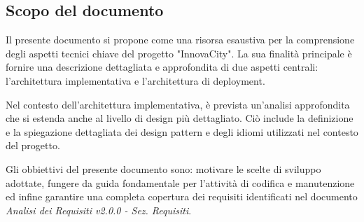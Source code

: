 \subsection{Scopo del documento}
Il presente documento si propone come una risorsa esaustiva per la comprensione degli aspetti tecnici chiave del progetto "InnovaCity". La sua finalità principale è fornire una descrizione dettagliata e approfondita di due aspetti centrali: l'architettura implementativa e l'architettura di deployment.

Nel contesto dell'architettura implementativa, è prevista un'analisi approfondita che si estenda anche al livello di design più dettagliato. Ciò include la definizione e la spiegazione dettagliata dei design pattern e degli idiomi utilizzati nel contesto del progetto.

Gli obbiettivi del presente documento sono: motivare le scelte di sviluppo adottate, fungere da guida fondamentale per l'attività di codifica e manutenzione ed infine garantire una completa copertura dei requisiti identificati nel documento \textit{Analisi dei Requisiti v2.0.0 - Sez. Requisiti}.